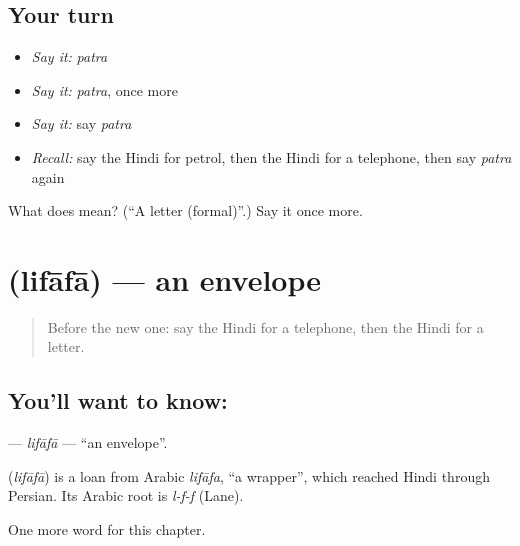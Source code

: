 \subsection*{Your turn}
\begin{itemize}
\raggedright
  \item \emph{Say it:} \emph{patra}
  \item \emph{Say it:} \emph{patra}, once more
  \item \emph{Say it:} say \emph{patra}
  \item \emph{Recall:} say the Hindi for petrol, then the Hindi for a telephone, then say \emph{patra} again
\end{itemize}

\begin{tcolorbox}[breakable,colback=teal!4,colframe=teal!35!black,title={Before you move on}]
What does  mean? (\textquotedblleft{}A letter (formal)\textquotedblright{}.) Say it once more.
\end{tcolorbox}
\section[\texorpdfstring{\hi{लिफ़ाफ़ा} (lifāfā)}{लिफ़ाफ़ा (lifāfā)}]{ (lifāfā) — an envelope}

\label{lesson:HI-C205-lifafa}



\begin{quote}
Before the new one: say the Hindi for a telephone, then the Hindi for a letter.
\end{quote}

\subsection*{You'll want to know: }
\textbf{} — \emph{lifāfā} — \textquotedblleft{}an envelope\textquotedblright{}.

\begin{cousinweb}
\textbf{} (\emph{lifāfā}) is a loan from Arabic \emph{lifāfa}, \textquotedblleft{}a wrapper\textquotedblright{}, which reached Hindi through Persian. Its Arabic root is \emph{l-f-f} (Lane).
\end{cousinweb}

\begin{grammarlens}[title={What you've built}]
One more word for this chapter.
\end{grammarlens}

